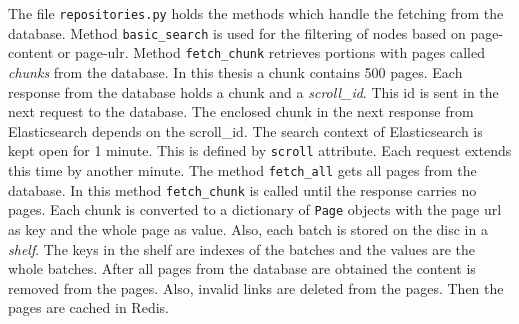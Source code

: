 The file \texttt{repositories.py} holds the methods which handle the fetching from the database. Method \texttt{basic\_search} is used for the filtering of nodes based on page-content or page-ulr. Method \texttt{fetch\_chunk} retrieves portions with pages called \textit{chunks} from the database. In this thesis a chunk contains 500 pages. Each response from the database holds a chunk and a \textit{scroll\_id}. This id is sent in the next request to the database. The enclosed chunk in the next response from Elasticsearch  depends on the scroll\_id. The search context of Elasticsearch is kept open for 1 minute. This is defined by \texttt{scroll} attribute. Each request extends this time by another minute. The method \texttt{fetch\_all} gets all pages from the database. In this method \texttt{fetch\_chunk} is called until the response carries no pages. Each chunk is converted to a dictionary of \texttt{Page} objects with the page url as key and the whole page as value. Also, each batch is stored on the disc in a \textit{shelf}. The keys in the shelf are indexes of the batches and the values are the whole batches. After all pages from the database are obtained the content is removed from the pages. Also, invalid links are deleted from the pages. Then the pages are cached in Redis.

